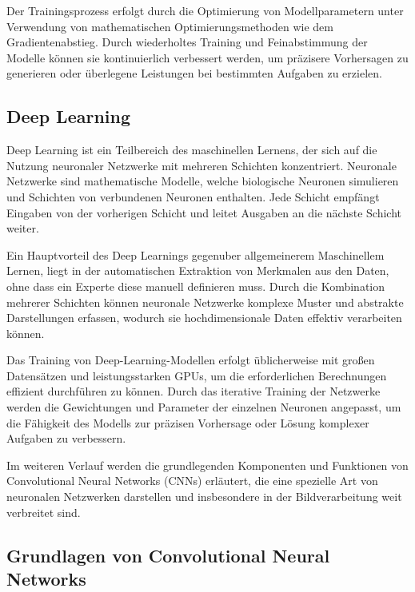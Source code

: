     Der Trainingsprozess erfolgt durch die Optimierung von Modellparametern unter Verwendung von mathematischen Optimierungsmethoden wie dem Gradientenabstieg.
    Durch wiederholtes Training und Feinabstimmung der Modelle können sie kontinuierlich verbessert werden, um präzisere Vorhersagen zu generieren oder überlegene Leistungen bei bestimmten Aufgaben zu erzielen.

\subsection{Deep Learning}

    Deep Learning ist ein Teilbereich des maschinellen Lernens, der sich auf die Nutzung neuronaler Netzwerke mit mehreren Schichten konzentriert.
    Neuronale Netzwerke sind mathematische Modelle, welche biologische Neuronen simulieren und Schichten von verbundenen Neuronen enthalten. Jede Schicht empfängt Eingaben von der vorherigen Schicht und leitet Ausgaben an die nächste Schicht weiter.

    Ein Hauptvorteil des Deep Learnings gegenuber allgemeinerem Maschinellem Lernen, liegt in der automatischen Extraktion von Merkmalen aus den Daten, ohne dass ein Experte diese manuell definieren muss.
    Durch die Kombination mehrerer Schichten können neuronale Netzwerke komplexe Muster und abstrakte Darstellungen erfassen, wodurch sie hochdimensionale Daten effektiv verarbeiten können.
    
    Das Training von Deep-Learning-Modellen erfolgt üblicherweise mit großen Datensätzen und leistungsstarken GPUs, um die erforderlichen Berechnungen effizient durchführen zu können.
    Durch das iterative Training der Netzwerke werden die Gewichtungen und Parameter der einzelnen Neuronen angepasst, um die Fähigkeit des Modells zur präzisen Vorhersage oder Lösung komplexer Aufgaben zu verbessern.
    
    Im weiteren Verlauf werden die grundlegenden Komponenten und Funktionen von Convolutional Neural Networks (CNNs) erläutert, die eine spezielle Art von neuronalen Netzwerken darstellen und insbesondere in der Bildverarbeitung weit verbreitet sind.

\subsection{Grundlagen von Convolutional Neural Networks}


